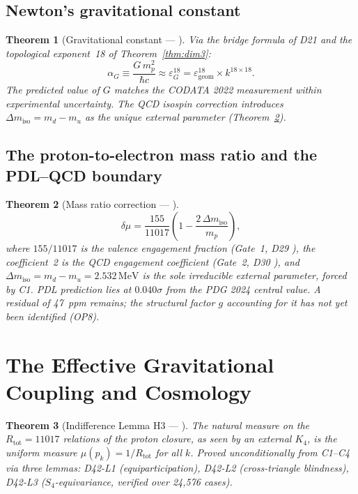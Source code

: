 \documentclass[12pt,a4paper]{article}
\theoremstyle{plain}
\newtheorem{theorem}{Theorem}[section]
\theoremstyle{definition}
\theoremstyle{remark}
\newcommand{\Kfour}{K_4}
\newcommand{\Rtot}{R_{\mathrm{tot}}}
\newcommand{\dmiso}{\Delta m_{\mathrm{iso}}}
\newcommand{\egeom}{\varepsilon_{\mathrm{geom}}}
\newcommand{\eG}{\varepsilon_G}
\begin{document}
\subsection{Newton's gravitational constant}

\begin{theorem}[Gravitational constant --- \citep{D21,D25,D29,D30}]
\label{thm:G}
Via the bridge formula of D21 \citep{D21} and the topological exponent~18 of Theorem~\ref{thm:dim3}:
\[
\alpha_G \equiv \frac{G\,m_p^2}{\hbar c} \approx \eG^{18} = \egeom^{18}\times k^{18\times 18}.
\]
The predicted value of $G$ matches the CODATA 2022 measurement within experimental uncertainty. The QCD isospin correction introduces $\dmiso=m_d-m_u$ as the unique external parameter (Theorem~\ref{thm:mu}).
\end{theorem}

\subsection{The proton-to-electron mass ratio and the PDL--QCD boundary}

\begin{theorem}[Mass ratio correction --- \citep{D28,D29,D30}]
\label{thm:mu}
\[
\delta\mu = \frac{155}{11017}\left(1-\frac{2\,\dmiso}{m_p}\right),
\]
where $155/11017$ is the valence engagement fraction (Gate~1, D29 \citep{D29}), the coefficient~2 is the QCD engagement coefficient (Gate~2, D30 \citep{D30}), and $\dmiso=m_d-m_u=2.532\,\mathrm{MeV}$ is the sole irreducible external parameter, forced by C1. PDL prediction lies at $0.040\sigma$ from the PDG 2024 central value. A residual of 47~ppm remains; the structural factor $g$ accounting for it has not yet been identified (OP8).
\end{theorem}

\section{The Effective Gravitational Coupling and Cosmology}
\label{sec:coupling}

\begin{theorem}[Indifference Lemma H3 --- \citep{D42}]
\label{thm:H3}
The natural measure on the $\Rtot=11017$ relations of the proton closure, as seen by an external $\Kfour$, is the uniform measure $\mu(p_k)=1/\Rtot$ for all $k$. Proved unconditionally from C1--C4 via three lemmas: D42-L1 (equiparticipation), D42-L2 (cross-triangle blindness), D42-L3 ($S_4$-equivariance, verified over 24,576 cases).
\end{theorem}
\end{document}
